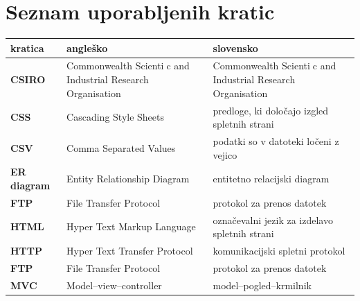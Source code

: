 \documentclass[a4paper, 12pt]{book}
\newcommand{\clearemptydoublepage}{\newpage{\pagestyle{empty}\cleardoublepage}}
\begin{document}
\clearemptydoublepage


\pagestyle{empty}
\def\thepage{}%
\tableofcontents{}


\clearemptydoublepage


\chapter*{Seznam uporabljenih kratic}  %

\noindent\begin{tabular}{p{}|p{}|p{}}    %
  {\bf kratica} & {\bf angleško}                             & {\bf slovensko} \\ \hline
  {\bf CSIRO} & Commonwealth Scientic and Industrial Research Organisation & Commonwealth Scientic and Industrial Research Organisation \\
  {\bf CSS} & Cascading Style Sheets & predloge, ki določajo izgled spletnih strani \\
  {\bf CSV} & Comma Separated Values & podatki so v datoteki ločeni z vejico \\
  {\bf ER diagram} & Entity Relationship Diagram & entitetno relacijski diagram \\
  {\bf FTP} & File Transfer Protocol & protokol za prenos datotek \\
  {\bf HTML} & Hyper Text Markup Language & označevalni jezik za izdelavo spletnih strani \\
  {\bf HTTP} & Hyper Text Transfer Protocol & komunikacijski spletni protokol \\
  {\bf FTP} & File Transfer Protocol & protokol za prenos datotek \\
  {\bf MVC} & Model--view--controller & model--pogled--krmilnik \\

\end{tabular}
\end{document}
